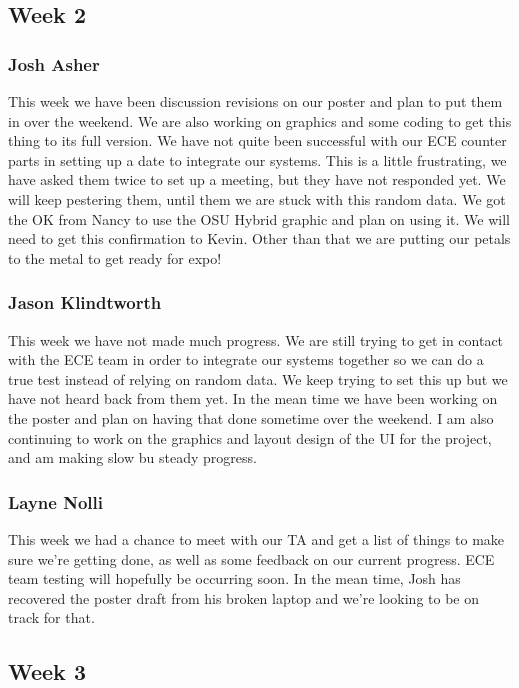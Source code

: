 \documentclass[10pt,draftclsnofoot,onecolumn]{IEEEtran}
\begin{document}
\subsection{Week 2}

\subsubsection{Josh Asher}
This week we have been discussion revisions on our poster and plan to put them in over the weekend. We are also working on graphics and some coding to get this thing to its full version. We have not quite been successful with our ECE counter parts in setting up a date to integrate our systems. This is a little frustrating, we have asked them twice to set up a meeting, but they have not responded yet. We will keep pestering them, until them we are stuck with this random data. We got the OK from Nancy to use the OSU Hybrid graphic and plan on using it. We will need to get this confirmation to Kevin. Other than that we are putting our petals to the metal to get ready for expo! \par

\subsubsection{Jason Klindtworth}
This week we have not made much progress. We are still trying to get in contact with the ECE team in order to integrate our systems together so we can do a true test instead of relying on random data. We keep trying to set this up but we have not heard back from them yet. In the mean time we have been working on the poster and plan on having that done sometime over the weekend. I am also continuing to work on the graphics and layout design of the UI for the project, and am making slow bu steady progress.\par

\subsubsection{Layne Nolli}
This week we had a chance to meet with our TA and get a list of things to make sure we're getting done, as well as some feedback on our current progress. ECE team testing will hopefully be occurring soon. In the mean time, Josh has recovered the poster draft from his broken laptop and we're looking to be on track for that. \par

\subsection{Week 3}
\end{document}

